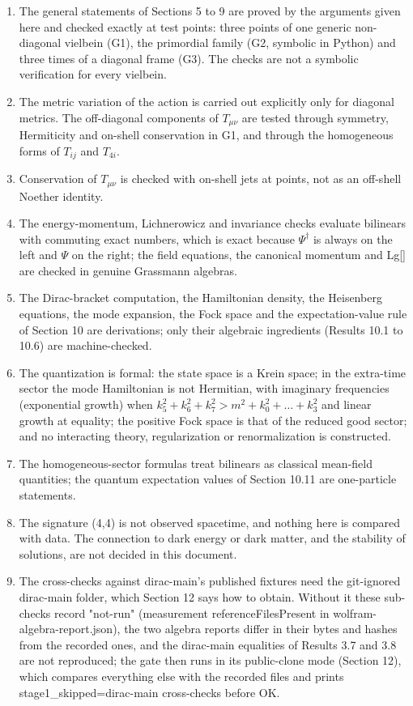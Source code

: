 \documentclass[11pt]{article}
\begin{document}
\begin{enumerate}
\item The general statements of Sections 5 to 9 are proved by the arguments given here and checked exactly at test points: three points of one generic non-diagonal vielbein (G1), the primordial family (G2, symbolic in Python) and three times of a diagonal frame (G3). The checks are not a symbolic verification for every vielbein.
\item The metric variation of the action is carried out explicitly only for diagonal metrics. The off-diagonal components of $T_{\mu\nu}$ are tested through symmetry, Hermiticity and on-shell conservation in G1, and through the homogeneous forms of $T_{ij}$ and $T_{4i}$.
\item Conservation of $T_{\mu\nu}$ is checked with on-shell jets at points, not as an off-shell Noether identity.
\item The energy-momentum, Lichnerowicz and invariance checks evaluate bilinears with commuting exact numbers, which is exact because $\Psi^\dagger$ is always on the left and $\Psi$ on the right; the field equations, the canonical momentum and Lg[] are checked in genuine Grassmann algebras.
\item The Dirac-bracket computation, the Hamiltonian density, the Heisenberg equations, the mode expansion, the Fock space and the expectation-value rule of Section 10 are derivations; only their algebraic ingredients (Results 10.1 to 10.6) are machine-checked.
\item The quantization is formal: the state space is a Krein space; in the extra-time sector the mode Hamiltonian is not Hermitian, with imaginary frequencies (exponential growth) when $k_5^2+k_6^2+k_7^2>m^2+k_0^2+\dots+k_3^2$ and linear growth at equality; the positive Fock space is that of the reduced good sector; and no interacting theory, regularization or renormalization is constructed.
\item The homogeneous-sector formulas treat bilinears as classical mean-field quantities; the quantum expectation values of Section 10.11 are one-particle statements.
\item The signature (4,4) is not observed spacetime, and nothing here is compared with data. The connection to dark energy or dark matter, and the stability of solutions, are not decided in this document.
\item The cross-checks against dirac-main's published fixtures need the git-ignored dirac-main folder, which Section 12 says how to obtain. Without it these sub-checks record "not-run" (measurement referenceFilesPresent in wolfram-algebra-report.json), the two algebra reports differ in their bytes and hashes from the recorded ones, and the dirac-main equalities of Results 3.7 and 3.8 are not reproduced; the gate then runs in its public-clone mode (Section 12), which compares everything else with the recorded files and prints stage1\_skipped=dirac-main cross-checks before OK.
\end{enumerate}
\end{document}
